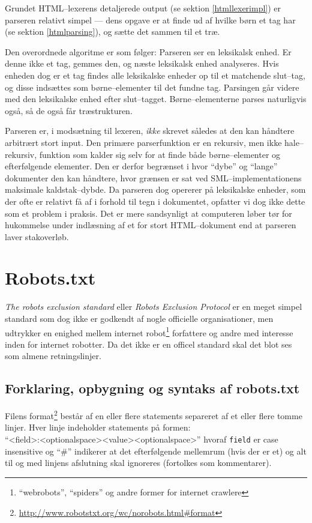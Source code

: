 \documentclass[a4paper,oneside]{memoir}
\begin{document}
Grundet HTML--lexerens detaljerede output (se sektion
\ref{htmllexerimpl}) er parseren relativt simpel --- dens opgave er at
finde ud af hvilke børn et tag har (se sektion \ref{htmlparsing}), og
sætte det sammen til et træ.

Den overordnede algoritme er som følger: Parseren ser en leksikalsk
enhed. Er denne ikke et tag, gemmes den, og næste leksikalsk enhed
analyseres. Hvis enheden dog er et tag findes alle leksikalske enheder
op til et matchende slut--tag, og disse indsættes som børne--elementer
til det fundne tag. Parsingen går videre med den leksikalske enhed
efter slut--tagget. Børne--elementerne parses naturligvis også, så de
også får træstrukturen.

Parseren er, i modsætning til lexeren, \textit{ikke} skrevet således
at den kan håndtere arbitrært stort input. Den primære parserfunktion
er en rekursiv, men ikke hale--rekursiv, funktion som kalder sig selv
for at finde både børne--elementer og efterfølgende elementer. Den er
derfor begrænset i hvor ``dybe'' og ``lange'' dokumenter den kan
håndtere, hvor grænsen er sat ved SML--implementationens maksimale
kaldstak--dybde. Da parseren dog opererer på leksikalske enheder, som
der ofte er relativt få af i forhold til tegn i dokumentet, opfatter
vi dog ikke dette som et problem i praksis. Det er mere sandsynligt at
computeren løber tør for hukommelse under indlæsning af et for stort
HTML--dokument end at parseren laver stakoverløb.

\section{Robots.txt}
\label{robots} 

\textit{The robots exclusion standard} eller \textit{Robots Exclusion Protocol}
er en meget simpel standard som dog ikke er godkendt af nogle officielle
organisationer, men udtrykker en enighed mellem
internet robot\footnote{``webrobots'',
``spiders'' og andre former for internet crawlere} forfattere og andre med
interesse inden for internet robotter. Da det ikke er en officel standard skal
det blot ses som almene retningslinjer.

\subsection{Forklaring, opbygning og syntaks af robots.txt}
Filens format\footnote{\url{http://www.robotstxt.org/wc/norobots.html\#format}}
består af en eller flere statements separeret af et eller flere tomme linjer.
Hver linje indeholder statements på formen:\\
``<field>:<optionalspace><value><optionalspace>'' hvoraf \texttt{field} er case
insensitive og ``\#'' indikerer at det efterfølgende mellemrum (hvis der er et)
og alt til og med linjens afslutning skal ignoreres (fortolkes som kommentarer).
\end{document}
